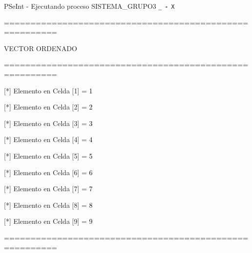 \documentclass[12pt,a4paper]{article}
\newcommand{\consola}[1]{\noindent\textcolor{pseString}{#1}}
\newcommand{\entrada}[1]{\textcolor{black}{#1}}
\newenvironment{PSeIntWindow}{%
	\begin{tcolorbox}[
		breakable,
		enhanced,
		colback=white,
		colframe=black!60,
		boxrule=0.5pt,
		arc=1mm,
		left=0mm,
		right=0mm,
		top=0mm,
		bottom=2mm,
		width=\textwidth
		]
	}{%
	\end{tcolorbox}
}
\newcommand{\BarraPSeInt}{%
	\colorbox{gray!20}{%
		\parbox{\dimexpr\textwidth-2\fboxsep\relax}{%
			\small
			\textcolor{pseString}{\faPlayCircle}
			\hspace{0.3em}
			PSeInt - Ejecutando proceso SISTEMA\_GRUPO3
			\hfill
			\texttt{\_ \hspace{0.5em} \(\square\) \hspace{0.5em} X}
		}
	}
}
\begin{document}
\begin{PSeIntWindow}
	
	\BarraPSeInt
	
	\vspace{0.2cm}
	
	\ttfamily\small
	
	\consola{========================================================}\par
	
	\vspace{0.2cm}
	
	\consola{VECTOR ORDENADO}\par
	
	\vspace{0.2cm}
	
	\consola{========================================================}\par
	
	\vspace{0.3cm}
	
	\consola{[*] Elemento en Celda [1] = }\entrada{1}\par
	
	\consola{[*] Elemento en Celda [2] = }\entrada{2}\par
	
	\consola{[*] Elemento en Celda [3] = }\entrada{3}\par
	
	\consola{[*] Elemento en Celda [4] = }\entrada{4}\par
	
	\consola{[*] Elemento en Celda [5] = }\entrada{5}\par
	
	\consola{[*] Elemento en Celda [6] = }\entrada{6}\par
	
	\consola{[*] Elemento en Celda [7] = }\entrada{7}\par
	
	\consola{[*] Elemento en Celda [8] = }\entrada{8}\par
	
	\consola{[*] Elemento en Celda [9] = }\entrada{9}\par
	
	\vspace{0.3cm}
	
	\consola{========================================================}\par
	
	\vspace{0.3cm}
	

\end{PSeIntWindow}
\end{document}
